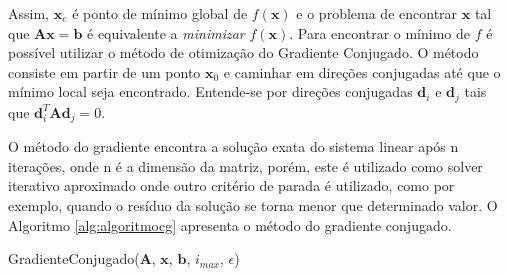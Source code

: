 Assim, $\mathbf{x}_e$ é ponto de mínimo global de $f(\mathbf{x})$ e o problema de encontrar $\mathbf{x}$ tal que $\mathbf{A}\mathbf{x} = \mathbf{b}$ é equivalente a \textit{minimizar} $f(\mathbf{x})$. Para encontrar o mínimo de $f$ é possível utilizar o método de otimização do Gradiente Conjugado. O método consiste em partir de um ponto $\mathbf{x}_0$ e caminhar em direções conjugadas até que o mínimo local seja encontrado. Entende-se por direções conjugadas $\mathbf{d}_i$ e $\mathbf{d}_j$ tais que $\mathbf{d}_i^T\mathbf{A}\mathbf{d}_j=0$. 

O método do gradiente encontra a solução exata do sistema linear após n iterações, onde n é a dimensão da matriz, porém, este é utilizado como solver iterativo aproximado onde outro critério de parada é utilizado, como por exemplo, quando o resíduo da solução se torna menor que determinado valor. O Algoritmo \ref{alg:algoritmocg} apresenta o método do gradiente conjugado. 


\vspace{1cm}
\begin{algorithm}[H]
\caption{GradienteConjugado($\mathbf{A}$, $\mathbf{x}$, $\mathbf{b}$, $i_{max}$, $\epsilon$)}
\label{alg:algoritmocg}
\end{algorithm}
\vspace{1cm}


